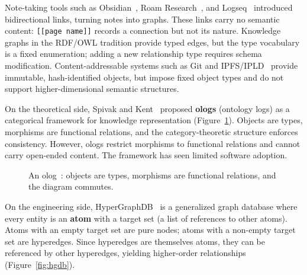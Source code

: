 Note-taking tools such as Obsidian~\cite{Obsidian}, Roam Research~\cite{RoamResearch}, and Logseq~\cite{Logseq} introduced bidirectional links, turning notes into graphs. These links carry no semantic content: \texttt{[[page name]]} records a connection but not its nature. Knowledge graphs in the RDF/OWL tradition provide typed edges, but the type vocabulary is a fixed enumeration; adding a new relationship type requires schema modification. Content-addressable systems such as Git and IPFS/IPLD~\cite{IPLD} provide immutable, hash-identified objects, but impose fixed object types and do not support higher-dimensional semantic structures.

On the theoretical side, Spivak and Kent~\cite{Spivak2012} proposed \textbf{ologs} (ontology logs) as a categorical framework for knowledge representation (Figure~\ref{fig:olog}). Objects are types, morphisms are functional relations, and the category-theoretic structure enforces consistency. However, ologs restrict morphisms to functional relations and cannot carry open-ended content. The framework has seen limited software adoption.

\begin{figure}[ht]
\centering
{}
\caption{An olog~\cite{Spivak2012}: objects are types, morphisms are functional relations, and the diagram commutes.}
\label{fig:olog}
\end{figure}

On the engineering side, HyperGraphDB~\cite{HyperGraphDB} is a generalized graph database where every entity is an \textbf{atom} with a target set (a list of references to other atoms). Atoms with an empty target set are pure nodes; atoms with a non-empty target set are hyperedges. Since hyperedges are themselves atoms, they can be referenced by other hyperedges, yielding higher-order relationships (Figure~\ref{fig:hgdb}).

